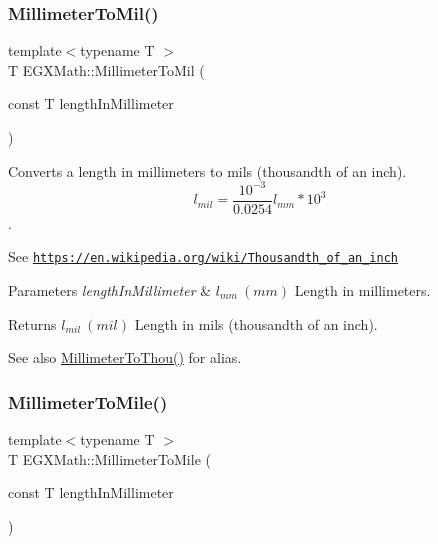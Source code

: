 \subsubsection{\texorpdfstring{Millimeter\+To\+Mil()}{MillimeterToMil()}}
{\footnotesize\ttfamily template$<$typename T $>$ \\
T E\+G\+X\+Math\+::\+Millimeter\+To\+Mil (\begin{DoxyParamCaption}\item[{const T}]{length\+In\+Millimeter }\end{DoxyParamCaption})}



Converts a length in millimeters to mils (thousandth of an inch). \[ l_{mil}= \frac{10^{-3}}{0.0254} l_{mm} * 10^{3} \]. 

See \href{https://en.wikipedia.org/wiki/Thousandth_of_an_inch}{\tt https\+://en.\+wikipedia.\+org/wiki/\+Thousandth\+\_\+of\+\_\+an\+\_\+inch} 
\begin{DoxyParams}{Parameters}
{\em length\+In\+Millimeter} & $ l_{mm}\ (mm)$ Length in millimeters. \\
\hline
\end{DoxyParams}
\begin{DoxyReturn}{Returns}
$ l_{mil}\ (mil)$ Length in mils (thousandth of an inch). 
\end{DoxyReturn}
\begin{DoxySeeAlso}{See also}
\mbox{\hyperlink{group___e_g_x_math-_conversions-_length_conversions-_millimeter-_imperial_ga099bde3b0f85fbbfbe91f0162a392835}{Millimeter\+To\+Thou()}} for alias. 
\end{DoxySeeAlso}
\mbox{\label{group___e_g_x_math-_conversions-_length_conversions-_millimeter-_imperial_ga8a11dcd8f7866189b30e01d65e003e2d}} 
\subsubsection{\texorpdfstring{Millimeter\+To\+Mile()}{MillimeterToMile()}}
{\footnotesize\ttfamily template$<$typename T $>$ \\
T E\+G\+X\+Math\+::\+Millimeter\+To\+Mile (\begin{DoxyParamCaption}\item[{const T}]{length\+In\+Millimeter }\end{DoxyParamCaption})}




